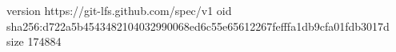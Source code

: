 version https://git-lfs.github.com/spec/v1
oid sha256:d722a5b4543482104032990068ed6c55e65612267fefffa1db9cfa01fdb3017d
size 174884

